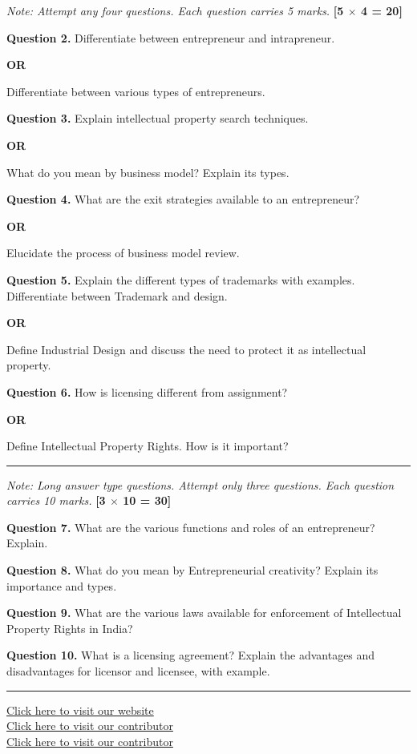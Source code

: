 \documentclass[11pt,a4paper]{article}
\begin{document}
\noindent   \textit{Note: Attempt any four questions. Each question carries 5 marks.} \hfill   \textbf{[5 $ \times$ 4 = 20]}

\medskip


\noindent   \textbf{Question 2.} Differentiate between entrepreneur and intrapreneur.
\centerline{   \textbf{OR}}
Differentiate between various types of entrepreneurs.

\medskip


\noindent   \textbf{Question 3.} Explain intellectual property search techniques.
\centerline{   \textbf{OR}}
What do you mean by business model? Explain its types.

\medskip


\noindent   \textbf{Question 4.} What are the exit strategies available to an entrepreneur?
\centerline{   \textbf{OR}}
Elucidate the process of business model review.

\medskip


\noindent   \textbf{Question 5.} Explain the different types of trademarks with examples. Differentiate between Trademark and design.
\centerline{   \textbf{OR}}
Define Industrial Design and discuss the need to protect it as intellectual property.

\medskip


\noindent   \textbf{Question 6.} How is licensing different from assignment?
\centerline{   \textbf{OR}}
Define Intellectual Property Rights. How is it important?

\bigskip


\rule{\linewidth}{0.4pt}\smallskip




\noindent   \textit{Note: Long answer type questions. Attempt only three questions. Each question carries 10 marks.} \hfill   \textbf{[3 $ \times$ 10 = 30]}

\medskip


\noindent   \textbf{Question 7.} What are the various functions and roles of an entrepreneur? Explain.

\medskip


\noindent   \textbf{Question 8.} What do you mean by Entrepreneurial creativity? Explain its importance and types.

\medskip


\noindent   \textbf{Question 9.} What are the various laws available for enforcement of Intellectual Property Rights in India?

\medskip


\noindent   \textbf{Question 10.} What is a licensing agreement? Explain the advantages and disadvantages for licensor and licensee, with example.

\vfill
\rule{\linewidth}{0.4pt}

\begin{center}\small
\href{https://bhu-exam.vercel.app/}{Click here to visit our website}\\[4pt]\href{https://me-aryan.vercel.app/}{Click here to visit our contributor}\\[4pt]\href{https://quashan-me.vercel.app/}{Click here to visit our contributor}
\end{center}
\end{document}
